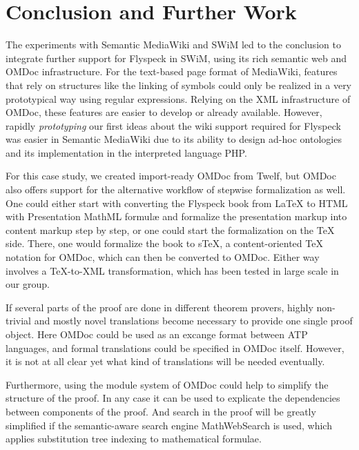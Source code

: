 
\section{Conclusion and Further Work}
\label{sec:conc}

The experiments with Semantic MediaWiki and SWiM led to the conclusion to
integrate further support for Flyspeck in SWiM, using its rich semantic web and
OMDoc infrastructure.  For the text-based
page format of MediaWiki, features that rely on structures like the linking
of symbols could only be realized in a very prototypical way using regular expressions.  Relying on the XML
infrastructure of OMDoc, these features are easier to develop or already
available.  However, rapidly \emph{prototyping} our first ideas about the wiki
support required for Flyspeck was easier in Semantic MediaWiki due to its
ability to design ad-hoc ontologies and its implementation in the interpreted
language PHP.

For this case study, we created import-ready OMDoc from Twelf, but OMDoc also
offers support for the alternative workflow of stepwise formalization
as well.  One could either start with
converting the Flyspeck book from {\LaTeX} to HTML with Presentation MathML
formulæ and formalize the presentation markup into content markup step by step,
or one could start the formalization on the {\TeX} side.  There, one would
formalize the book to s\TeX{}, a content-oriented {\TeX} notation for OMDoc,
which can then be converted to OMDoc\cite{Kohlhase:albwo06}.  Either way
involves a {\TeX}-to-XML transformation, which has been tested in large scale in
our group\cite{URL:arXMLiv}.

If several parts of the proof are done in different theorem provers, highly non-trivial and mostly novel translations become necessary to provide one single proof object. Here OMDoc could be used as an excange format between ATP languages, and formal translations could be specified in OMDoc itself. However, it is not at all clear yet what kind of translations will be needed eventually.

Furthermore, using the module system of OMDoc could help to simplify the structure of the proof. In any case it can be used to explicate the dependencies between components of the proof. And search in the proof will be greatly simplified if the semantic-aware search engine MathWebSearch\cite{KohSuc:asemf06} is used, which applies substitution tree indexing to mathematical formulae.



